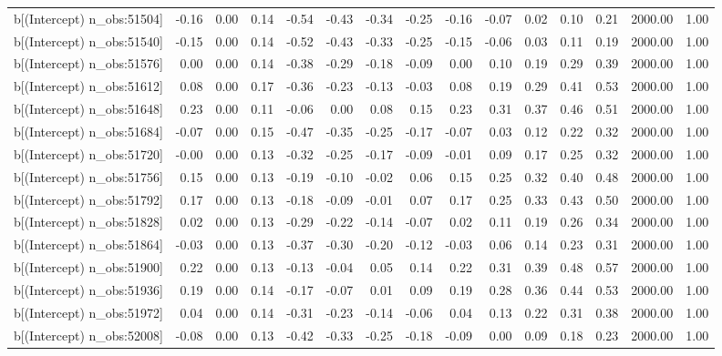 \begin{table}[ht]
\begin{tabular}{rrrrrrrrrrrrrrr}
  b[(Intercept) n\_obs:51504] & -0.16 & 0.00 & 0.14 & -0.54 & -0.43 & -0.34 & -0.25 & -0.16 & -0.07 & 0.02 & 0.10 & 0.21 & 2000.00 & 1.00 \\ 
  b[(Intercept) n\_obs:51540] & -0.15 & 0.00 & 0.14 & -0.52 & -0.43 & -0.33 & -0.25 & -0.15 & -0.06 & 0.03 & 0.11 & 0.19 & 2000.00 & 1.00 \\ 
  b[(Intercept) n\_obs:51576] & 0.00 & 0.00 & 0.14 & -0.38 & -0.29 & -0.18 & -0.09 & 0.00 & 0.10 & 0.19 & 0.29 & 0.39 & 2000.00 & 1.00 \\ 
  b[(Intercept) n\_obs:51612] & 0.08 & 0.00 & 0.17 & -0.36 & -0.23 & -0.13 & -0.03 & 0.08 & 0.19 & 0.29 & 0.41 & 0.53 & 2000.00 & 1.00 \\ 
  b[(Intercept) n\_obs:51648] & 0.23 & 0.00 & 0.11 & -0.06 & 0.00 & 0.08 & 0.15 & 0.23 & 0.31 & 0.37 & 0.46 & 0.51 & 2000.00 & 1.00 \\ 
  b[(Intercept) n\_obs:51684] & -0.07 & 0.00 & 0.15 & -0.47 & -0.35 & -0.25 & -0.17 & -0.07 & 0.03 & 0.12 & 0.22 & 0.32 & 2000.00 & 1.00 \\ 
  b[(Intercept) n\_obs:51720] & -0.00 & 0.00 & 0.13 & -0.32 & -0.25 & -0.17 & -0.09 & -0.01 & 0.09 & 0.17 & 0.25 & 0.32 & 2000.00 & 1.00 \\ 
  b[(Intercept) n\_obs:51756] & 0.15 & 0.00 & 0.13 & -0.19 & -0.10 & -0.02 & 0.06 & 0.15 & 0.25 & 0.32 & 0.40 & 0.48 & 2000.00 & 1.00 \\ 
  b[(Intercept) n\_obs:51792] & 0.17 & 0.00 & 0.13 & -0.18 & -0.09 & -0.01 & 0.07 & 0.17 & 0.25 & 0.33 & 0.43 & 0.50 & 2000.00 & 1.00 \\ 
  b[(Intercept) n\_obs:51828] & 0.02 & 0.00 & 0.13 & -0.29 & -0.22 & -0.14 & -0.07 & 0.02 & 0.11 & 0.19 & 0.26 & 0.34 & 2000.00 & 1.00 \\ 
  b[(Intercept) n\_obs:51864] & -0.03 & 0.00 & 0.13 & -0.37 & -0.30 & -0.20 & -0.12 & -0.03 & 0.06 & 0.14 & 0.23 & 0.31 & 2000.00 & 1.00 \\ 
  b[(Intercept) n\_obs:51900] & 0.22 & 0.00 & 0.13 & -0.13 & -0.04 & 0.05 & 0.14 & 0.22 & 0.31 & 0.39 & 0.48 & 0.57 & 2000.00 & 1.00 \\ 
  b[(Intercept) n\_obs:51936] & 0.19 & 0.00 & 0.14 & -0.17 & -0.07 & 0.01 & 0.09 & 0.19 & 0.28 & 0.36 & 0.44 & 0.53 & 2000.00 & 1.00 \\ 
  b[(Intercept) n\_obs:51972] & 0.04 & 0.00 & 0.14 & -0.31 & -0.23 & -0.14 & -0.06 & 0.04 & 0.13 & 0.22 & 0.31 & 0.38 & 2000.00 & 1.00 \\ 
  b[(Intercept) n\_obs:52008] & -0.08 & 0.00 & 0.13 & -0.42 & -0.33 & -0.25 & -0.18 & -0.09 & 0.00 & 0.09 & 0.18 & 0.23 & 2000.00 & 1.00 \\ 

\end{tabular}
\end{table}
